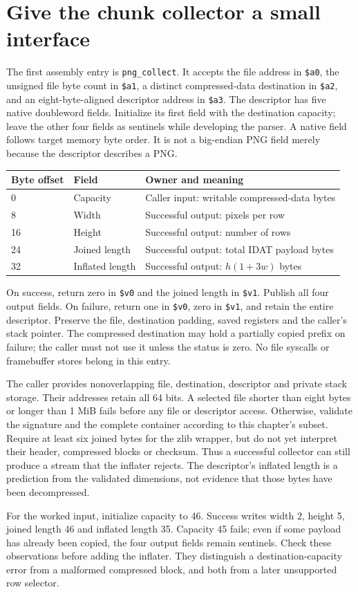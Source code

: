 \section{Give the chunk collector a small interface}
The first assembly entry is \texttt{png\_collect}. It accepts the file address in
\texttt{\$a0}, the unsigned file byte count in \texttt{\$a1}, a distinct compressed-data
destination in \texttt{\$a2}, and an eight-byte-aligned descriptor address in
\texttt{\$a3}. The descriptor has five native doubleword fields. Initialize its first
field with the destination capacity; leave the other four fields as sentinels while
developing the parser. A native field follows target memory byte order. It is not a
big-endian PNG field merely because the descriptor describes a PNG.

\begin{longtable}{p{22mm}p{35mm}p{93mm}}
\toprule Byte offset & Field & Owner and meaning \\\midrule
0 & Capacity & Caller input: writable compressed-data bytes \\
8 & Width & Successful output: pixels per row \\
16 & Height & Successful output: number of rows \\
24 & Joined length & Successful output: total IDAT payload bytes \\
32 & Inflated length & Successful output: $h(1+3w)$ bytes \\\bottomrule
\end{longtable}
On success, return zero in \texttt{\$v0} and the joined length in \texttt{\$v1}.
Publish all four output fields. On failure, return one in \texttt{\$v0}, zero in
\texttt{\$v1}, and retain the entire descriptor. Preserve the file, destination
padding, saved registers and the caller's stack pointer. The compressed destination
may hold a partially copied prefix on failure; the caller must not use it unless the
status is zero. No file syscalls or framebuffer stores belong in this entry.

The caller provides nonoverlapping file, destination, descriptor and private stack
storage. Their addresses retain all 64 bits. A selected file shorter than eight bytes
or longer than 1 MiB fails before any file or descriptor access. Otherwise, validate
the signature and the complete container according to this chapter's subset. Require
at least six joined bytes for the zlib wrapper, but do not yet interpret their header,
compressed blocks or checksum. Thus a successful collector can still produce a stream
that the inflater rejects. The descriptor's inflated length is a prediction from the
validated dimensions, not evidence that those bytes have been decompressed.

For the worked input, initialize capacity to 46. Success writes width 2, height 5,
joined length 46 and inflated length 35. Capacity 45 fails; even if some payload has
already been copied, the four output fields remain sentinels. Check these observations
before adding the inflater. They distinguish a destination-capacity error from a
malformed compressed block, and both from a later unsupported row selector.

